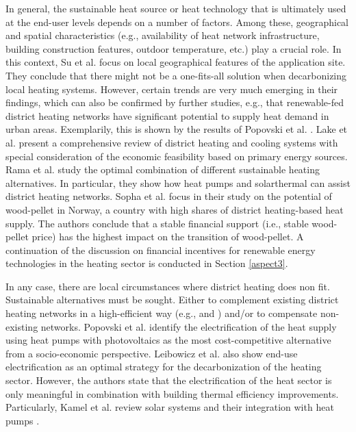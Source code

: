 In general, the sustainable heat source or heat technology that is ultimately used at the end-user levels depends on a number of factors. Among these, geographical and spatial characteristics (e.g., availability of heat network infrastructure, building construction features, outdoor temperature, etc.) play a crucial role. In this context, Su et al. \cite{su2018heating} focus on local geographical features of the application site. They conclude that there might not be a one-fits-all solution when decarbonizing local heating systems. However, certain trends are very much emerging in their findings, which can also be confirmed by further studies, e.g., that renewable-fed district heating networks have significant potential to supply heat demand in urban areas. Exemplarily, this is shown by the results of Popovski et al. \cite{popovski2018technical}. Lake et al. \cite{lake2017review} present a comprehensive review of district heating and cooling systems with special consideration of the economic feasibility based on primary energy sources. Rama et al. \cite{rama2018introduction} study the optimal combination of different sustainable heating alternatives. In particular, they show how heat pumps and solarthermal can assist district heating networks. Sopha et al. \cite{sopha2011exploring} focus in their study on the potential of wood-pellet in Norway, a country with high shares of district heating-based heat supply. The authors conclude that a stable financial support (i.e., stable wood-pellet price) has the highest impact on the transition of wood-pellet. A continuation of the discussion on financial incentives for renewable energy technologies in the heating sector is conducted in Section \ref{aspect3}.\vspace{0.5cm}

In any case, there are local circumstances where district heating does non fit. Sustainable alternatives must be sought. Either to complement existing district heating networks in a high-efficient way (e.g., \cite{rama2018introduction} and \cite{sopha2011exploring}) and/or to compensate non-existing networks. Popovski et al. \cite{popovski2018technical} identify the electrification of the heat supply using heat pumps with photovoltaics as the most cost-competitive alternative from a socio-economic perspective. Leibowicz et al. \cite{leibowicz2018optimal} also show end-use electrification as an optimal strategy for the decarbonization of the heating sector. However, the authors state that the electrification of the heat sector is only meaningful in combination with building thermal efficiency improvements. Particularly, Kamel et al. review solar systems and their integration with heat pumps \cite{kamel2015solar}.\vspace{0.5cm}

